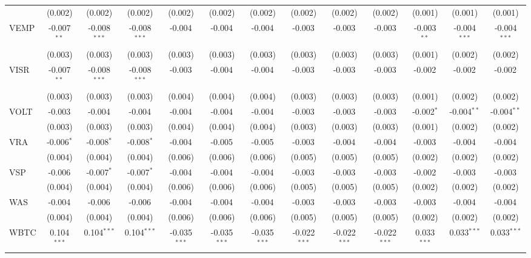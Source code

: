 \begin{table}[!htbp]
\begin{tabular}{@{\extracolsep{5pt}}lcccccccccccc}
  & (0.002) & (0.002) & (0.002) & (0.002) & (0.002) & (0.002) & (0.002) & (0.002) & (0.002) & (0.001) & (0.001) & (0.001) \\
 VEMP & -0.007$^{**}$ & -0.008$^{***}$ & -0.008$^{***}$ & -0.004$^{}$ & -0.004$^{}$ & -0.004$^{}$ & -0.003$^{}$ & -0.003$^{}$ & -0.003$^{}$ & -0.003$^{**}$ & -0.004$^{***}$ & -0.004$^{***}$ \\
  & (0.003) & (0.003) & (0.003) & (0.003) & (0.003) & (0.003) & (0.003) & (0.003) & (0.003) & (0.001) & (0.002) & (0.002) \\
 VISR & -0.007$^{**}$ & -0.008$^{***}$ & -0.008$^{***}$ & -0.003$^{}$ & -0.004$^{}$ & -0.004$^{}$ & -0.003$^{}$ & -0.003$^{}$ & -0.003$^{}$ & -0.002$^{}$ & -0.002$^{}$ & -0.002$^{}$ \\
  & (0.003) & (0.003) & (0.003) & (0.004) & (0.004) & (0.004) & (0.003) & (0.003) & (0.003) & (0.001) & (0.002) & (0.002) \\
 VOLT & -0.003$^{}$ & -0.004$^{}$ & -0.004$^{}$ & -0.004$^{}$ & -0.004$^{}$ & -0.004$^{}$ & -0.003$^{}$ & -0.003$^{}$ & -0.003$^{}$ & -0.002$^{*}$ & -0.004$^{**}$ & -0.004$^{**}$ \\
  & (0.003) & (0.003) & (0.003) & (0.004) & (0.004) & (0.004) & (0.003) & (0.003) & (0.003) & (0.001) & (0.002) & (0.002) \\
 VRA & -0.006$^{*}$ & -0.008$^{*}$ & -0.008$^{*}$ & -0.004$^{}$ & -0.005$^{}$ & -0.005$^{}$ & -0.003$^{}$ & -0.004$^{}$ & -0.004$^{}$ & -0.003$^{}$ & -0.004$^{}$ & -0.004$^{}$ \\
  & (0.004) & (0.004) & (0.004) & (0.006) & (0.006) & (0.006) & (0.005) & (0.005) & (0.005) & (0.002) & (0.002) & (0.002) \\
 VSP & -0.006$^{}$ & -0.007$^{*}$ & -0.007$^{*}$ & -0.004$^{}$ & -0.004$^{}$ & -0.004$^{}$ & -0.003$^{}$ & -0.003$^{}$ & -0.003$^{}$ & -0.002$^{}$ & -0.003$^{}$ & -0.003$^{}$ \\
  & (0.004) & (0.004) & (0.004) & (0.006) & (0.006) & (0.006) & (0.005) & (0.005) & (0.005) & (0.002) & (0.002) & (0.002) \\
 WAS & -0.004$^{}$ & -0.006$^{}$ & -0.006$^{}$ & -0.004$^{}$ & -0.004$^{}$ & -0.004$^{}$ & -0.003$^{}$ & -0.003$^{}$ & -0.003$^{}$ & -0.003$^{}$ & -0.004$^{}$ & -0.004$^{}$ \\
  & (0.004) & (0.004) & (0.004) & (0.006) & (0.006) & (0.006) & (0.005) & (0.005) & (0.005) & (0.002) & (0.002) & (0.002) \\
 WBTC & 0.104$^{***}$ & 0.104$^{***}$ & 0.104$^{***}$ & -0.035$^{***}$ & -0.035$^{***}$ & -0.035$^{***}$ & -0.022$^{***}$ & -0.022$^{***}$ & -0.022$^{***}$ & 0.033$^{***}$ & 0.033$^{***}$ & 0.033$^{***}$ \\

\end{tabular}
\end{table}
